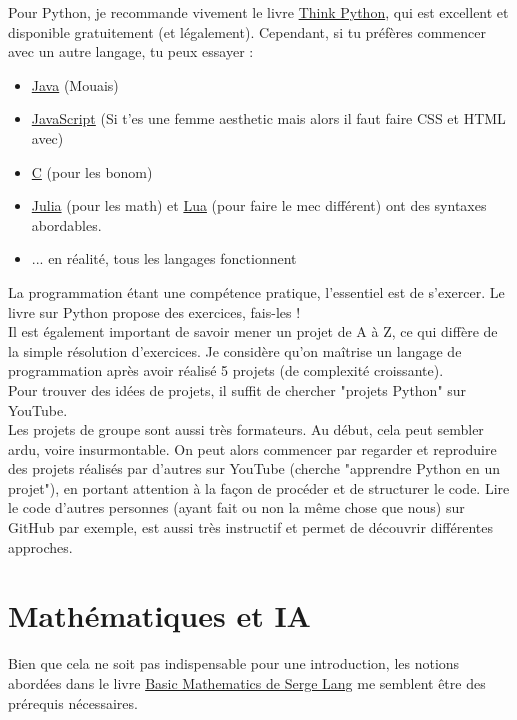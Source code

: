 \documentclass[12pt]{article}
\begin{document}
Pour Python, je recommande vivement le livre \href{https://greenteapress.com/thinkpython2/thinkpython2.pdf}{Think Python}, qui est excellent et disponible gratuitement (et légalement).
Cependant, si tu préfères commencer avec un autre langage, tu peux essayer :
\begin{itemize}
\item \href{https://www.youtube.com/playlist?list=PLZPZq0r_RZOMhCAyywfnYLlrjiVOkdAI1}{Java} (Mouais)
\item \href{https://developer.mozilla.org/fr/}{JavaScript} (Si t'es une femme aesthetic mais alors il faut faire CSS et HTML avec)
\item \href{https://www.amazon.com/Programming-Language-2nd-Brian-Kernighan/dp/0131103628}{C} (pour les bonom)
\item \href{https://www.oreilly.com/library/view/think-julia/9781492045021/}{Julia} (pour les math) et \href{https://www.lua.org/pil/contents.html}{Lua} (pour faire le mec différent) ont des syntaxes abordables.
\item ... en réalité, tous les langages fonctionnent
\end{itemize}

La programmation étant une compétence pratique, l'essentiel est de s'exercer. Le
livre sur Python propose des exercices, fais-les !\\
Il est également important de savoir mener un projet de A à Z, ce qui diffère
de la simple résolution d'exercices. Je considère qu'on maîtrise
un langage de programmation après avoir réalisé 5 projets (de complexité croissante).\\
Pour trouver des idées de projets, il suffit de chercher "projets Python" sur YouTube.\\
Les projets de groupe sont aussi très formateurs. Au début, cela peut sembler ardu,
voire insurmontable. On peut alors commencer par regarder et reproduire des projets
réalisés par d'autres sur YouTube (cherche "apprendre Python en un projet"), en portant attention
à la façon de procéder et de structurer le code. Lire le code d'autres personnes
(ayant fait ou non la même chose que nous) sur GitHub par exemple, est aussi très instructif
et permet de découvrir différentes approches.

\section{Mathématiques et IA}
Bien que cela ne soit pas indispensable pour une introduction, les notions abordées dans le livre
\href{https://www.amazon.com/Basic-Mathematics-Serge-Lang/dp/0387967877}{Basic Mathematics de Serge Lang} me semblent être des prérequis nécessaires.
\end{document}

